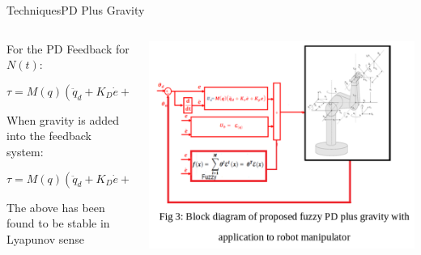\documentclass{beamer}
\begin{document}
\begin{frame}{Techniques}{PD Plus Gravity\cite{piltan}}
\begin{columns}
    \begin{column}{0.47\textwidth}
        For the PD Feedback for $N(t)$: \begin{footnotesize}
        \begin{equation*}
        \tau = M(q)(\ddot{q}_d + K_D\dot{e} + K_Pe) + N(q,\dot{q})
        \end{equation*}\end{footnotesize}
        When gravity is added into the feedback system:
        \begin{footnotesize}\begin{equation*}
        \tau = M(q)(\ddot{q}_d + K_D\dot{e} + K_Pe) + G(q)
        \end{equation*}\end{footnotesize}
        The above has been found to be stable in Lyapunov sense
    \end{column} 
    \begin{column}{0.5\textwidth}
        \includegraphics[scale=.2]{./images/fuzzy_pd_plus_gravity.png}
    \end{column}
\end{columns}
\end{frame}
\end{document}
